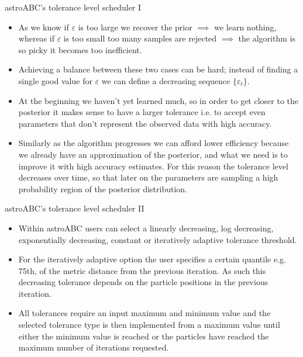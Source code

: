 \documentclass{beamer}
\theoremstyle{remark}
\newcommand{\nologo}{\setbeamertemplate{logo}{}} %
\begin{document}
{\nologo
\begin{frame}{astroABC's tolerance level scheduler I}
\begin{itemize}[<+->]
    \item As we know if $\varepsilon$ is too large we recover the prior $\implies$ we learn nothing, whereas if $\varepsilon$ is too small too many samples are rejected $\implies$ the algorithm is so picky it becomes too inefficient. 
    \item Achieving a balance between these two cases can be hard; instead of finding a single good value for $\varepsilon$ we can define a decreasing sequence $\{\varepsilon_t\}$.
    \item At the beginning we haven't yet learned much, so in order to get closer to the posterior it makes sense to have a larger tolerance i.e. to accept even parameters that don't represent the observed data with high accuracy.
    \item Similarly as the algorithm progresses we can afford lower efficiency because we already have an approximation of the posterior, and what we need is to improve it with high accuracy estimates. For this reason the tolerance level decreases over time, so that later on the parameters are sampling a high probability region of the posterior distribution.
\end{itemize}
\end{frame}
}

\begin{frame}{astroABC's tolerance level scheduler II}
\begin{itemize}[<+->]
    \item Within astroABC users can select a linearly decreasing, log decreasing, exponentially decreasing, constant or iteratively adaptive tolerance threshold. 
    \item For the iteratively adaptive option the user specifies a certain quantile e.g. 75th, of the metric distance from the previous iteration. As such this decreasing tolerance depends on the particle positions in the previous iteration.
    \item All tolerances require an input maximum and minimum value and the selected tolerance type is then implemented from a maximum value until either the minimum value is reached or the particles have reached the maximum number of iterations requested.
\end{itemize}    
\end{frame}
\end{document}
